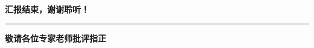 \documentclass[notheorems]{beamer}
\begin{document}
	\begin{frame}[plain]
		\vspace{1.2cm}
		\begin{center}
			{\fontsize{26}{32}\selectfont\bfseries\sffamily\color{structure.fg} 汇报结束，谢谢聆听！}

			\vspace{0.8cm}
			{\color{structure.fg!35}\rule{0.5\linewidth}{0.8pt}}

			\vspace{0.6cm}
			{\fontsize{13}{18}\selectfont\bfseries\sffamily\color{structure.fg} 敬请各位专家老师批评指正}
		\end{center}
	\end{frame}
\end{document}
